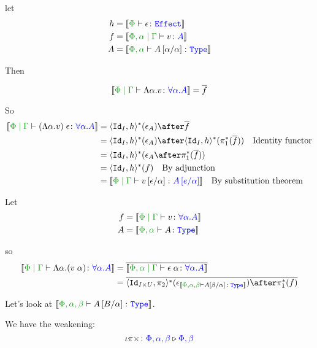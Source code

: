 \documentclass{report}
\begin{document}
    let 
    \begin{align*}
        h & = \deno{\typerelation{\P}{\e}{\effect}}
        \\
        f & = \deno{\etyperelation{\P,\a}{\G}{v}{A}}
        \\
        A &= \deno{\typerelation{\P,\a}{A\ssub{\a}{\a}}{\type}}
    \end{align*}

    Then

    \begin{equation}
        \deno{\gpetyperelation{\elam{\a}{v}}{\all{\a}{A}}} = \bar{f}\\
    \end{equation}

    So
    \begin{align*}
        \deno{\gpetyperelation{\eapp{(\elam{\a}{v})}{\e}}{\all{\a}{A}}} & = \pr{\Id{I}}{h}\star(\e_A)\after\bar{f}\\
        & = \pr{\Id{I}}{h}\star(\e_A)\after\pr{\Id{I}}{h}\star(\pstar(\bar{f}))\qt{Identity functor}\\
        &= \pr{\Id{I}}{h}\star(\e_A\after\pstar(\bar{f}))\\
        &= \pr{\Id{I}}{h}\star(f)\qt{By adjunction}\\
        &= \deno{\gpetyperelation{v\ssub{\a}{\e}}{A\ssub{\a}{e}}}\qt{By substitution theorem}\\
    \end{align*}

    Let \begin{align*}
        f & = \deno{\gpetyperelation{v}{\all{\a}{A}}}\\
        A & = \deno{\typerelation{\P,\a}{A}{\type}}
    \end{align*}

    so
    \begin{align*}
        \deno{\gpetyperelation{\elam{\a}{(\eapp{v}{\a})}}{\all{\a}{A}}} & = \bar{\deno{\etyperelation{\P,\a}{\G}{\eapp{\e}{\a}}{\all{\a}{A}}}} \\
        & = \bar{\pr{\Id{I\times U}}{\pp}\star(\e_{\deno{\typerelation{\P,\a,\b}{A\ssub{\a}{\b}}{\type}}})\after\pstar(f)}
    \end{align*}

    Let's look at $\deno{\typerelation{\P,\a,\b}{A\ssub{\a}{B}}{\type}}$.

    We have the weakening:
    \begin{equation}
        \iota\pi\times \colon {\color{blue}\Phi,\alpha,\beta} \triangleright {\color {blue} \Phi,\beta}
    \end{equation}
\end{document}

